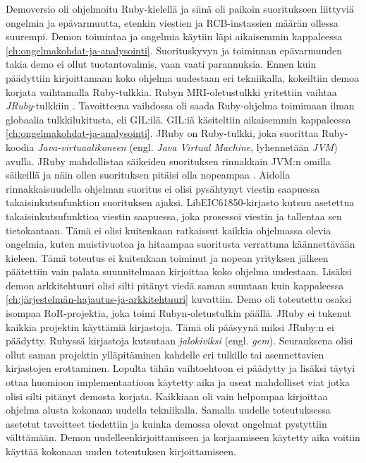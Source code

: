 Demoversio oli ohjelmoitu Ruby-kielellä ja siinä oli paikoin suoritukseen liittyviä ongelmia ja epävarmuutta, etenkin viestien ja RCB-instassien määrän ollessa suurempi. Demon toimintaa ja ongelmia käytiin läpi aikaisemmin kappaleessa \ref{ch:ongelmakohdat-ja-analysointi}. Suorituskyvyn ja toiminnan epävarmuuden takia demo ei ollut tuotantovalmis, vaan vaati parannuksia. Ennen kuin päädyttiin kirjoittamaan koko ohjelma uudestaan eri tekniikalla, kokeiltiin demoa korjata vaihtamalla Ruby-tulkkia. Rubyn MRI-oletustulkki yritettiin vaihtaa \emph{JRuby}-tulkkiin \cite{jruby-homepage}. Tavoitteena vaihdossa oli saada Ruby-ohjelma toimimaan ilman globaalia tulkkilukitusta, eli GIL:ilä. GIL:iä käsiteltiin aikaisemmin kappaleessa \ref{ch:ongelmakohdat-ja-analysointi}. JRuby on Ruby-tulkki, joka suorittaa Ruby-koodia \emph{Java-virtuaalikoneen} (engl. \emph{Java Virtual Machine}, lyhennetään \emph{JVM}) avulla. JRuby mahdollistaa säikeiden suorituksen rinnakkain JVM:n omilla säikeillä ja näin ollen suorituksen pitäisi olla nopeampaa \mbox{\cite{Youssef2013}}. Aidolla rinnakkaisuudella ohjelman suoritus ei olisi pysähtynyt viestin saapuessa takaisinkutsufunktion suorituksen ajaksi. LibEIC61850-kirjasto kutsuu asetettua takaisinkutsufunktioa viestin saapuessa, joka prosessoi viestin ja tallentaa sen tietokantaan. Tämä ei olisi kuitenkaan ratkaissut kaikkia ohjelmassa olevia ongelmia, kuten muistivuotoa ja hitaampaa suoritusta verrattuna käännettävään kieleen. Tämä toteutus ei kuitenkaan toiminut ja nopean yrityksen jälkeen päätettiin vain palata suunnitelmaan kirjoittaa koko ohjelma uudestaan. Lisäksi demon arkkitehtuuri olisi silti pitänyt viedä saman suuntaan kuin kappaleessa \ref{ch:järjestelmän-hajautus-ja-arkkitehtuuri} kuvattiin. Demo oli toteutettu osaksi isompaa RoR-projektia, joka toimi Rubyn-oletustulkin päällä. JRuby ei tukenut kaikkia projektin käyttämiä kirjastoja. Tämä oli pääsyynä miksi JRuby:n ei päädytty. Rubyssä kirjastoja kutsutaan \emph{jalokiviksi} (engl. \emph{gem}). Seurauksena olisi ollut saman projektin ylläpitäminen kahdelle eri tulkille tai asennettavien kirjastojen erottaminen. Lopulta tähän vaihtoehtoon ei päädytty ja lisäksi täytyi ottaa huomioon implementaatioon käytetty aika ja useat mahdolliset viat jotka olisi silti pitänyt demosta korjata. Kaikkiaan oli vain helpompaa kirjoittaa ohjelma alusta kokonaan uudella tekniikalla. Samalla uudelle toteutuksessa asetetut tavoitteet tiedettiin ja kuinka demossa olevat ongelmat pystyttiin välttämään. Demon uudelleenkirjoittamiseen ja korjaamiseen käytetty aika voitiin käyttää kokonaan uuden toteutuksen kirjoittamiseen.

